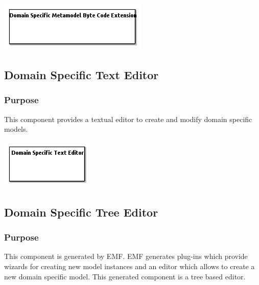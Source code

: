 \documentclass{gemoc} %
\begin{document}
\begin{center}
\includegraphics*[trim=0.0cm 0.0cm 0cm 0.0cm, clip=true]{../images/generated/Generated_Domain_Specific_Metamodel_Byte_Code_Extension.png}
\end{center}




\subsection{Domain Specific Text Editor}


\subsubsection{Purpose}
This component provides a textual editor to create and modify domain specific models.

\begin{center}
\includegraphics*[trim=0.0cm 0.0cm 0cm 0.0cm, clip=true]{../images/generated/Generated_Domain_Specific_Text_Editor.png}
\end{center}




\subsection{Domain Specific Tree Editor}


\subsubsection{Purpose}
This component is generated by EMF. EMF generates plug-ins which provide wizards for creating new model instances and an editor which allows to create a new domain specific model. This generated component is a tree based editor.
\end{document}
